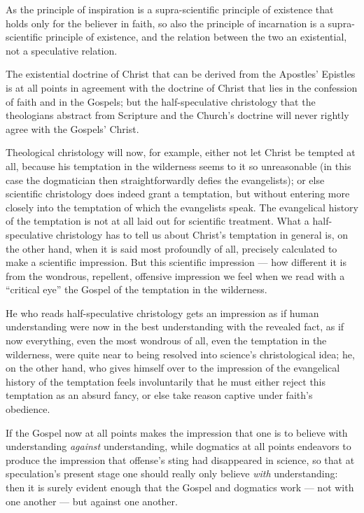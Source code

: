 \documentclass[12pt,a4paper]{book}
\begin{document}
As the principle of inspiration is a supra-scientific principle of existence that holds only for
the believer in faith, so also the principle of incarnation is a supra-scientific principle of
existence, and the relation between the two an existential, not a speculative relation.

The existential doctrine of Christ that can be derived from the Apostles' Epistles is at all
points in agreement with the doctrine of Christ that lies in the confession of faith and in the
Gospels; but the half-speculative christology that the theologians abstract from Scripture and
the Church's doctrine will never rightly agree with the Gospels' Christ.

Theological christology will now, for example, either not let Christ be tempted at all, because
his temptation in the wilderness seems to it so unreasonable (in this case the dogmatician then
straightforwardly defies the evangelists); or else scientific christology does indeed grant a
temptation, but without entering more closely into the temptation of which the evangelists
speak. The evangelical history of the temptation is not at all laid out for scientific
treatment. What a half-speculative christology has to tell us about Christ's temptation in
general is, on the other hand, when it is said most profoundly of all, precisely calculated to
make a scientific impression. But this scientific impression --- how different it is from the
wondrous, repellent, offensive impression we feel when we read with a ``critical eye'' the
Gospel of the temptation in the wilderness.

He who reads half-speculative christology gets an impression as if human understanding were now
in the best understanding with the revealed fact, as if now everything, even the most wondrous
of all, even the temptation in the wilderness, were quite near to being resolved into science's
christological idea; he, on the other hand, who gives himself over to the impression of the
evangelical history of the temptation feels involuntarily that he must either reject
this temptation as an absurd fancy, or else take reason captive under faith's obedience.

If the Gospel now at all points makes the impression that one is to believe with understanding
\emph{against} understanding, while dogmatics at all points endeavors to produce the impression
that offense's sting had disappeared in science, so that at speculation's present stage one
should really only believe \emph{with} understanding: then it is surely evident enough that the
Gospel and dogmatics work --- not with one another --- but against one another.
\end{document}
